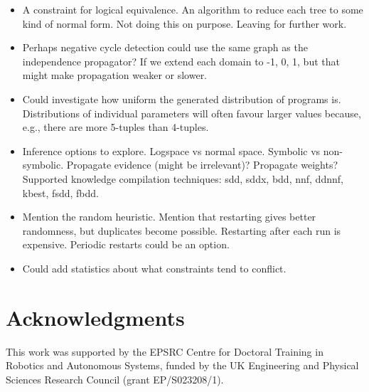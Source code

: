 \documentclass[runningheads]{llncs}
\begin{document}
\begin{itemize}
\item A constraint for logical equivalence. An algorithm to reduce each tree to
  some kind of normal form. Not doing this on purpose. Leaving for further work.
\item Perhaps negative cycle detection could use the same graph as the
  independence propagator? If we extend each domain to {-1, 0, 1}, but that
  might make propagation weaker or slower.
\item Could investigate how uniform the generated distribution of programs is.
  Distributions of individual parameters will often favour larger values
  because, e.g., there are more 5-tuples than 4-tuples.
\item Inference options to explore. Logspace vs normal space. Symbolic vs
  non-symbolic. Propagate evidence (might be irrelevant)? Propagate weights?
  Supported knowledge compilation techniques: sdd, sddx, bdd, nnf, ddnnf, kbest,
  fsdd, fbdd.
\item Mention the random heuristic. Mention that restarting gives better
  randomness, but duplicates become possible. Restarting after each run is
  expensive. Periodic restarts could be an option.
\item Could add statistics about what constraints tend to conflict.
\end{itemize}

\section*{Acknowledgments}

This work was supported by the EPSRC Centre for Doctoral Training in Robotics
and Autonomous Systems, funded by the UK Engineering and Physical Sciences
Research Council (grant EP/S023208/1).



\end{document}
